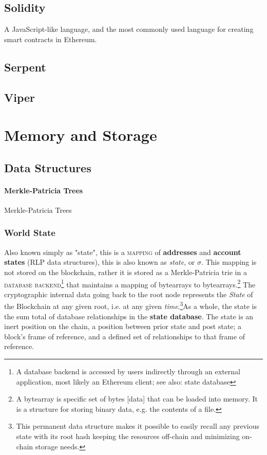 \documentclass[10pt,a4paper,leqno,bibliography=totoc]{scrartcl}
\newenvironment{alphafootnotes}
{\par\edef\savedfootnotenumber{\number\value{footnote}}
\renewcommand{\thefootnote}{\alph{footnote}}
\setcounter{footnote}{0}}
{\par\setcounter{footnote}{\savedfootnotenumber}}
\begin{document}
\begin{alphafootnotes}
\begin{multicols*}{2}
		\subsection{Solidity}
			A JavaScript-like language, and the most commonly used language for creating smart contracts in Ethereum.
		\subsection{Serpent}
		\subsection{Viper}

	\section{Memory and Storage}
			
		\subsection{Data Structures}

				\paragraph{Merkle-Patricia Trees}
					Merkle-Patricia Trees
			
				\subsubsection{World State}
					Also known simply as "state", this is a \textsc{mapping} of \textbf{addresses} and \textbf{account states} (RLP data structures), this is also known as \textit{state}, or $\sigma$. This mapping is not stored on the blockchain, rather it is stored as a Merkle-Patricia \gls{trie} in a \textsc{database backend}\footnote{A database backend is accessed by users indirectly through an external application, most likely an Ethereum client; see also: \gls{state database}} that maintains a mapping of bytearrays to bytearrays.\footnote{A bytearray is specific set of bytes [data] that can be loaded into memory. It is a structure for storing binary data, e.g. the contents of a file.} The cryptographic internal data going back to the \gls{root node} represents the \textit{State} of the Blockchain at any given root, i.e. at any given \textit{time}.\footnote{This permanent data structure makes it possible to easily recall any previous state with its root hash keeping the resources off-chain and minimizing on-chain storage needs.}As a whole, the state is the sum total of database relationships in the \textbf{ \gls{state database}}. The state is an inert position on the chain, a position between prior state and post state; a block's frame of reference, and a defined set of relationships to that frame of reference.



\end{multicols*}
\end{alphafootnotes}
\end{document}
